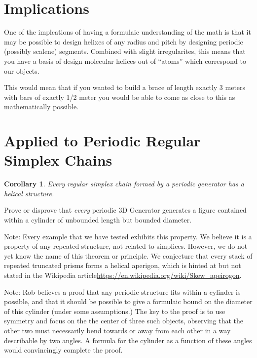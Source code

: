 \documentclass[11pt]{article}
\newtheorem{corollary}{Corollary}
\begin{document}
{\section{Implications}

One of the implcations of having a formulaic understanding of the math
is that it may be possible to design helixes
of any radius and pitch by designing periodic (possibly scalene) segments. Combined with slight
irregularites, this means that you have a basis of design molecular helices
out of ``atoms'' which correspond to our objects.

This would mean that if you wanted to build a brace of length exactly 3 meters
with bars of exactly 1/2 meter you would be able to come as close to this
as mathematically possible.






\section{Applied to Periodic Regular Simplex Chains}

\begin{corollary}
  Every regular simplex chain formed by a periodic generator has a helical structure.
  \end{corollary}

Prove or disprove that {\em every} periodic 3D Generator generates a figure contained within a cylinder of unbounded length but bounded diameter.

Note: Every example that we have tested exhibits this property. We believe it is a property of any repeated structure, not related to simplices.
However, we do not yet know the name of this theorem or principle. We conjecture that every stack of repeated truncated prisms
forms a helical aperigon, which is hinted at but not stated in the Wikipedia article\url{https://en.wikipedia.org/wiki/Skew_apeirogon}.

Note: Rob believes a proof that any periodic structure fits within a cylinder is possible, and that it should be possible to give a formulaic bound
on the diameter of this cylinder (under some assumptions.) The key to the proof is to use symmetry and focus on the the center of three
such objects, observing that the other two must necessarily bend towards or away from each other in a way describable by two angles.
A formula for the cylinder as a function of these angles would convincingly complete the proof.



}
\end{document}
